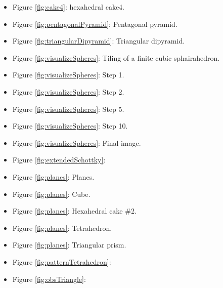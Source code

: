 \documentclass[suppldata, dvipdfmx]{interact}
\theoremstyle{plain}%
\theoremstyle{definition}
\theoremstyle{remark}
\theoremstyle{problemstyle}
\begin{document}
\begin{itemize}
\item Figure \ref{fig:cake4}: hexahedral cake4.
\item Figure \ref{fig:pentagonalPyramid}: Pentagonal pyramid.
\item Figure \ref{fig:triangularDipyramid}: Triangular dipyramid.

\item Figure \ref{fig:visualizeSpheres}: Tiling of a finite cubic sphairahedron.
\item Figure
      \ref{fig:visualizeSpheres}: Step
      1.
\item Figure
      \ref{fig:visualizeSpheres}: Step
      2.
\item Figure
      \ref{fig:visualizeSpheres}: Step
      5.
\item Figure
      \ref{fig:visualizeSpheres}: Step
      10.
\item Figure
      \ref{fig:visualizeSpheres}:
      Final image.
\item Figure \ref{fig:extendedSchottky}:
%

\item Figure \ref{fig:planes}: Planes.
\item Figure \ref{fig:planes}: Cube.
\item Figure \ref{fig:planes}: Hexahedral cake \#2.
\item Figure \ref{fig:planes}: Tetrahedron.
\item Figure \ref{fig:planes}: Triangular prism.

\item Figure \ref{fig:patternTetrahedron}:
\item Figure \ref{fig:obsTriangle}:


\end{itemize}
\end{document}
